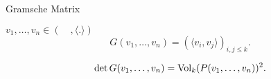 \documentclass[class=article, crop=false]{standalone}
\begin{document}
\begin{zettel}{Gramsche Matrix}
\begin{flashcard}[]{}
	\begin{definition}

		$v_1,\dots,v_n \in  (\quad, \langle .\rangle)$
		\[
			G (v_1,\dots,v_n) = ( \langle v_i,v_j\rangle)_{i,j\leq k}
		.\]

	\end{definition}

\end{flashcard}

\begin{theorem}
	\[
		\det G (v_1,\dots,v_n) = \operatorname{Vol}_k(P(v_1,\dots,v_n))^2
	.\]
\end{theorem}
\end{zettel}
\end{document}
